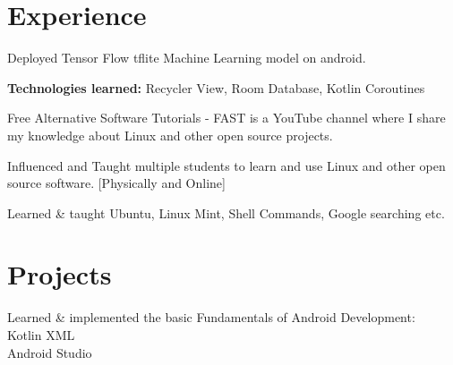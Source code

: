 \documentclass[]{deedy-resume-openfont}
\begin{document}
\begin{minipage}[t]{0.66\textwidth} 


\section{Experience}

\vspace{\topsep} %
\begin{tightemize}
\item Deployed Tensor Flow tflite Machine Learning model on android.
\item \textbf{Technologies learned: } Recycler View, Room Database, Kotlin Coroutines
\end{tightemize}
\sectionsep

\begin{tightemize}
\item Free Alternative Software Tutorials - FAST is a YouTube channel where I share my knowledge about Linux and other open source projects.
\item Influenced and Taught multiple students to learn and use Linux and other open source software. [Physically and Online]
\item Learned \& taught Ubuntu, Linux Mint, Shell Commands, Google searching etc. 
\end{tightemize}
\sectionsep






\section{Projects}

\begin{tightemize}
\item Learned \& implemented the basic Fundamentals of Android Development: \\
\quad \textbullet{} Kotlin \textbullet{} XML \\
\quad \textbullet{} Android Studio \\
\end{tightemize}
\sectionsep



\end{minipage}
\end{document}

